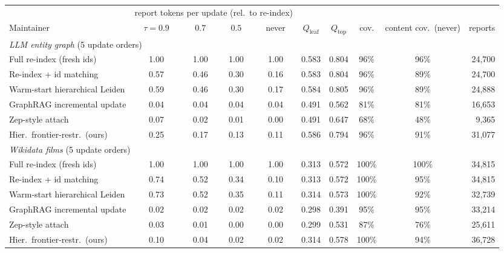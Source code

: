\begin{tabular}{l c c c c c c c c r}
\toprule
 & \multicolumn{4}{c}{report tokens per update (rel.\ to re-index)} & & & & & \\
\cmidrule(lr){2-5}
Maintainer & $\tau{=}0.9$ & $0.7$ & $0.5$ & never & $Q_\mathrm{leaf}$ & $Q_\mathrm{top}$ & cov. & content cov.\ (never) & reports\\
\midrule
\multicolumn{10}{l}{\emph{LLM entity graph} (5 update orders)}\\
Full re-index (fresh ids) & 1.00 & 1.00 & 1.00 & 1.00 & 0.583 & 0.804 & 96\% & 96\% & 24{,}700 \\
Re-index + id matching & 0.57 & 0.46 & 0.30 & 0.16 & 0.583 & 0.804 & 96\% & 89\% & 24{,}700 \\
Warm-start hierarchical Leiden & 0.59 & 0.46 & 0.30 & 0.17 & 0.584 & 0.805 & 96\% & 89\% & 24{,}888 \\
GraphRAG incremental update & 0.04 & 0.04 & 0.04 & 0.04 & 0.491 & 0.562 & 81\% & 81\% & 16{,}653 \\
Zep-style attach & 0.07 & 0.02 & 0.01 & 0.00 & 0.491 & 0.647 & 68\% & 48\% & 9{,}365 \\
Hier.\ frontier-restr.\ (ours) & 0.25 & 0.17 & 0.13 & 0.11 & 0.586 & 0.794 & 96\% & 91\% & 31{,}077 \\
\midrule
\multicolumn{10}{l}{\emph{Wikidata films} (5 update orders)}\\
Full re-index (fresh ids) & 1.00 & 1.00 & 1.00 & 1.00 & 0.313 & 0.572 & 100\% & 100\% & 34{,}815 \\
Re-index + id matching & 0.74 & 0.52 & 0.34 & 0.10 & 0.313 & 0.572 & 100\% & 95\% & 34{,}815 \\
Warm-start hierarchical Leiden & 0.73 & 0.52 & 0.35 & 0.11 & 0.314 & 0.573 & 100\% & 92\% & 32{,}739 \\
GraphRAG incremental update & 0.02 & 0.02 & 0.02 & 0.02 & 0.298 & 0.391 & 95\% & 95\% & 33{,}214 \\
Zep-style attach & 0.03 & 0.01 & 0.00 & 0.00 & 0.299 & 0.531 & 87\% & 76\% & 25{,}611 \\
Hier.\ frontier-restr.\ (ours) & 0.10 & 0.04 & 0.02 & 0.02 & 0.314 & 0.578 & 100\% & 94\% & 36{,}728 \\
\bottomrule
\end{tabular}
